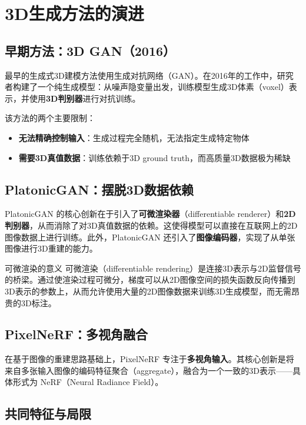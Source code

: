\section{3D生成方法的演进}

\subsection{早期方法：3D GAN（2016）}

最早的生成式3D建模方法使用生成对抗网络（GAN）。在2016年的工作中，研究者构建了一个纯生成模型：从噪声隐变量出发，训练模型生成3D体素（voxel）表示，并使用\textbf{3D判别器}进行对抗训练。

该方法的两个主要限制：
\begin{itemize}
    \item \textbf{无法精确控制输入}：生成过程完全随机，无法指定生成特定物体
    \item \textbf{需要3D真值数据}：训练依赖于3D ground truth，而高质量3D数据极为稀缺
\end{itemize}

\subsection{PlatonicGAN：摆脱3D数据依赖}

PlatonicGAN 的核心创新在于引入了\textbf{可微渲染器}（differentiable renderer）和\textbf{2D判别器}，从而消除了对3D真值数据的依赖。这使得模型可以直接在互联网上的2D图像数据上进行训练。此外，PlatonicGAN 还引入了\textbf{图像编码器}，实现了从单张图像进行3D重建的能力。

\begin{knowledgebox}{可微渲染的意义}
可微渲染（differentiable rendering）是连接3D表示与2D监督信号的桥梁。通过使渲染过程可微分，梯度可以从2D图像空间的损失函数反向传播到3D表示的参数上，从而允许使用大量的2D图像数据来训练3D生成模型，而无需昂贵的3D标注。
\end{knowledgebox}

\subsection{PixelNeRF：多视角融合}

在基于图像的重建思路基础上，PixelNeRF 专注于\textbf{多视角输入}。其核心创新是将来自多张输入图像的编码特征聚合（aggregate），融合为一个一致的3D表示——具体形式为 NeRF（Neural Radiance Field）。

\subsection{共同特征与局限}

